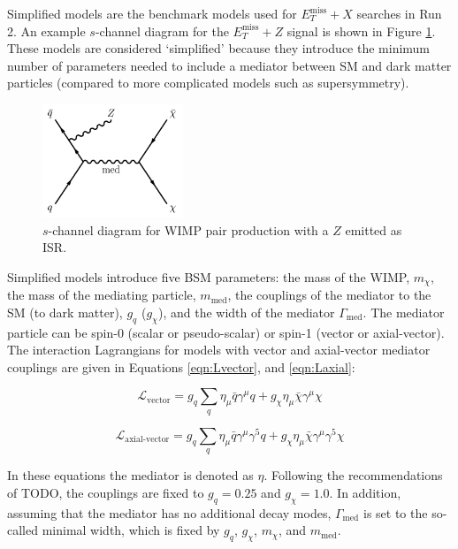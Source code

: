Simplified models are the benchmark models used for $E_T^\text{miss}+X$ searches in Run 2. An example $s$-channel diagram for the $E_T^\text{miss}+Z$ signal is shown in Figure \ref{fig:simp}. These models are considered `simplified' because they introduce the minimum number of parameters needed to include a mediator between SM and dark matter particles (compared to more complicated models such as supersymmetry). 

\begin{figure}[htb]
\centering
\includegraphics[width=0.375\textwidth]{Figures/simp.png}
\caption{$s$-channel diagram for WIMP pair production with a $Z$ emitted as ISR.}
\label{fig:simp}
\end{figure}

Simplified models introduce five BSM parameters: the mass of the WIMP, $m_\chi$, the mass of the mediating particle, $m_\text{med}$, the couplings of the mediator to the SM (to dark matter), $g_q$ ($g_\chi$), and the width of the mediator $\Gamma_\text{med}$. The mediator particle can be spin-0 (scalar or pseudo-scalar) or spin-1 (vector or axial-vector). The interaction Lagrangians for models with vector and axial-vector mediator couplings are given in Equations \ref{eqn:Lvector}, and \ref{eqn:Laxial}:

\begin{equation}
\mathcal{L}_\text{vector} = g_q \sum_q \eta_\mu \bar{q} \gamma^\mu q + g_\chi \eta_\mu \bar{\chi} \gamma^\mu \chi
\label{eqn:Lvector}
\end{equation}

\begin{equation}
\mathcal{L}_\text{axial-vector} = g_q \sum_q \eta_\mu \bar{q} \gamma^\mu \gamma^5 q + g_\chi \eta_\mu \bar{\chi} \gamma^\mu \gamma^5\chi
\label{eqn:Laxial}
\end{equation}

\noindent In these equations the mediator is denoted as $\eta$. Following the recommendations of TODO, the couplings are fixed to $g_q = 0.25$ and $g_\chi = 1.0$. In addition, assuming that the mediator has no additional decay modes, $\Gamma_\text{med}$ is set to the so-called minimal width, which is fixed by $g_q$, $g_\chi$, $m_\chi$, and $m_\text{med}$. %

